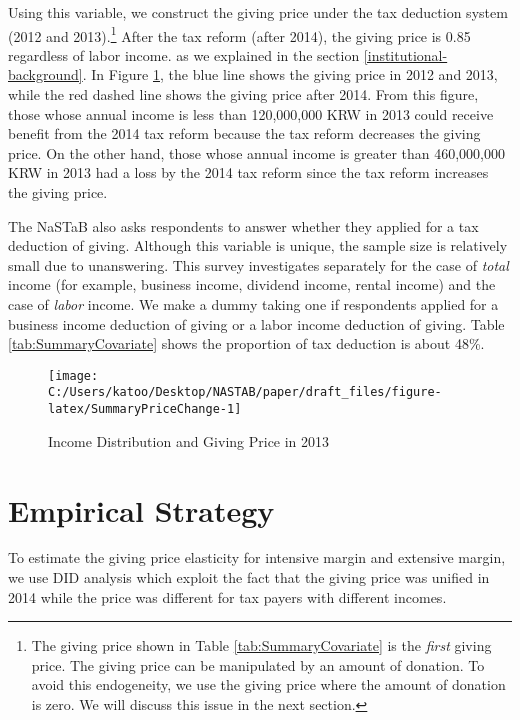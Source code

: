 \documentclass[
  11pt,
  a4paper,
]{article}
\begin{document}
Using this variable, we construct the giving price under the tax deduction system (2012 and 2013).\footnote{The giving price shown in Table \ref{tab:SummaryCovariate} is the \emph{first} giving price. The giving price can be manipulated by an amount of donation. To avoid this endogeneity, we use the giving price where the amount of donation is zero. We will discuss this issue in the next section.}
After the tax reform (after 2014), the giving price is 0.85 regardless of labor income.
as we explained in the section \ref{institutional-background}.
In Figure \ref{fig:SummaryPriceChange},
the blue line shows the giving price in 2012 and 2013,
while the red dashed line shows the giving price after 2014.
From this figure,
those whose annual income is less than 120,000,000 KRW in 2013 could receive benefit from the 2014 tax reform
because the tax reform decreases the giving price.
On the other hand,
those whose annual income is greater than 460,000,000 KRW in 2013 had a loss by the 2014 tax reform
since the tax reform increases the giving price.

The NaSTaB also asks respondents to answer whether they applied for a tax deduction of giving.
Although this variable is unique, the sample size is relatively small due to unanswering.
This survey investigates separately for the case of \emph{total} income (for example, business income, dividend income, rental income)
and the case of \emph{labor} income.
We make a dummy taking one if respondents applied for a business income deduction of giving
or a labor income deduction of giving.
Table \ref{tab:SummaryCovariate} shows the proportion of tax deduction is about 48\%.

\begin{figure}[t]

{\centering \texttt{[image: C:/Users/katoo/Desktop/NASTAB/paper/draft\_files/figure-latex/SummaryPriceChange-1]} 

}

\caption{Income Distribution and Giving Price in 2013}\label{fig:SummaryPriceChange}
\end{figure}

\hypertarget{empirical-strategy}{%
\section{Empirical Strategy}\label{empirical-strategy}}

To estimate the giving price elasticity for intensive margin and extensive margin, we use DID analysis which exploit the fact that the giving price was unified in 2014 while the price was different for tax payers with different incomes.
\end{document}
